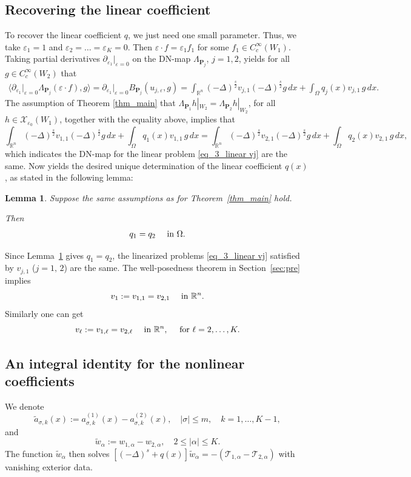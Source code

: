 \documentclass [oneside,11pt] {amsart}
\numberwithin{equation}{section}
\newtheorem{lemma}{Lemma}[section]
\newcommand{\R}{\mathbb{R}}
\newcommand{\p}{\partial}
\newcommand{\dx}{\,dx}
\newcommand{\LA}{\langle}
\newcommand{\RA}{\rangle}
\begin{document}
\subsection{Recovering the linear coefficient}
To recover the linear coefficient $q$, we just need one small parameter. Thus, we take $\varepsilon_1=1$ and $\varepsilon_2=\ldots=\varepsilon_K=0$. Then $\varepsilon\cdot f = \varepsilon_1 f_1$ for some $f_1\in C^\infty_c(W_1)$. Taking partial derivatives $\p _{\varepsilon_1}\big|_{\varepsilon=0}$ on the DN-map $\Lambda_{\mathbf{P}_j}$, $j=1,2$, yields for all $g\in C^\infty_c(W_2)$ that
\begin{align*}
\LA 
\p _{\varepsilon_1}\big|_{\varepsilon=0}\Lambda_{\mathbf{P}_j} (\varepsilon\cdot f),g \RA 
= \p _{\varepsilon_1}\big|_{\varepsilon=0}
B_{\mathbf{P}_j}(u_{j,\varepsilon},g) 
=\int_{\R^n} (-\Delta)^{\frac{s}{2}}v_{j,1} (-\Delta)^{\frac{s}{2}}g \dx + \int_\Omega q_j(x)v_{j,1} \, g \dx.
\end{align*}
The assumption of Theorem \ref{thm_main} that
$\Lambda_{\mathbf{P}_{1}} h|_{W_2} =\Lambda_{\mathbf{P}_{2}}h|_{W_2}$, for all $h\in \mathcal{X}_{\varepsilon_0} (W_1)$, together with the equality above, implies that 
\[
\int_{\R^n} (-\Delta)^{\frac{s}{2}}v_{1,1} (-\Delta)^{\frac{s}{2}}g \dx + \int_\Omega q_1(x)v_{1,1} \, g \dx
=\int_{\R^n} (-\Delta)^{\frac{s}{2}}v_{2,1} (-\Delta)^{\frac{s}{2}}g \dx + \int_\Omega q_2(x)v_{2,1} \, g \dx,
\]
which indicates the DN-map for the linear problem \eqref{eq_3_linear vj} are the same. 
Now \cite[Theorem 1.3]{CMR21} yields the desired unique determination of the linear coefficient $q(x)$, as stated in the following lemma:
\begin{lemma}\label{lemma_recover q}
Suppose the same assumptions as for Theorem~\ref{thm_main} hold.

Then 
\begin{align*}
q_1=q_2\quad\hbox{ in }\Omega.
\end{align*}
\end{lemma}

Since Lemma~\ref{lemma_recover q} gives $q_1=q_2$, the linearized problems \eqref{eq_3_linear vj} satisfied by $v_{j,1}$ ($j=1,\,2$) are the same. The well-posedness theorem in Section~\ref{sec:pre} implies
$$
v_1 :=v_{1,1}=v_{2,1}\quad \hbox{ in }\R^n.
$$
Similarly one can get 
$$
v_\ell :=v_{1,\ell}=v_{2,\ell}\quad \hbox{ in }\R^n,\quad \hbox{ for }\ell=2,\ldots, K.
$$






\subsection{An integral identity for the nonlinear coefficients}
We denote
$$
\widetilde{a}_{\sigma, k}(x):=a^{(1)}_{\sigma, k}(x)-a^{(2)}_{\sigma, k}(x), \quad |\sigma|\leq m,\quad k=1,\ldots, K-1,
$$
and 
$$
\widetilde{w}_\alpha:=w_{1,\alpha}-w_{2,\alpha}, \quad 2\leq |\alpha|\leq K.
$$
The function $ \widetilde{w}_\alpha$ then solves $[(-\Delta)^s + q(x)]\widetilde{w}_{\alpha}=-(\mathcal{T}_{1,\alpha}-\mathcal{T}_{2,\alpha})$ with vanishing exterior data. 
\end{document}
